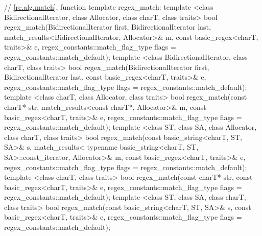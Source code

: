 \begin{codeblock}
{  // \ref{re.alg.match}, function template regex_match:
  template <class BidirectionalIterator, class Allocator,
      class charT, class traits>
    bool regex_match(BidirectionalIterator first, BidirectionalIterator last,
                     match_results<BidirectionalIterator, Allocator>& m,
                     const basic_regex<charT, traits>& e,
                     regex_constants::match_flag_type flags =
                       regex_constants::match_default);
  template <class BidirectionalIterator, class charT, class traits>
  bool regex_match(BidirectionalIterator first, BidirectionalIterator last,
                   const basic_regex<charT, traits>& e,
                   regex_constants::match_flag_type flags =
                     regex_constants::match_default);
  template <class charT, class Allocator, class traits>
    bool regex_match(const charT* str, match_results<const charT*, Allocator>& m,
                     const basic_regex<charT, traits>& e,
                     regex_constants::match_flag_type flags =
                       regex_constants::match_default);
  template <class ST, class SA, class Allocator, class charT, class traits>
    bool regex_match(const basic_string<charT, ST, SA>& s,
                     match_results<
                       typename basic_string<charT, ST, SA>::const_iterator, 
                       Allocator>& m, 
                     const basic_regex<charT, traits>& e, 
                     regex_constants::match_flag_type flags =
                       regex_constants::match_default);
  template <class charT, class traits>
    bool regex_match(const charT* str,
                     const basic_regex<charT, traits>& e,
                     regex_constants::match_flag_type flags =
                       regex_constants::match_default);
  template <class ST, class SA, class charT, class traits>
    bool regex_match(const basic_string<charT, ST, SA>& s,
                     const basic_regex<charT, traits>& e,
                     regex_constants::match_flag_type flags =
                       regex_constants::match_default);

}
\end{codeblock}
